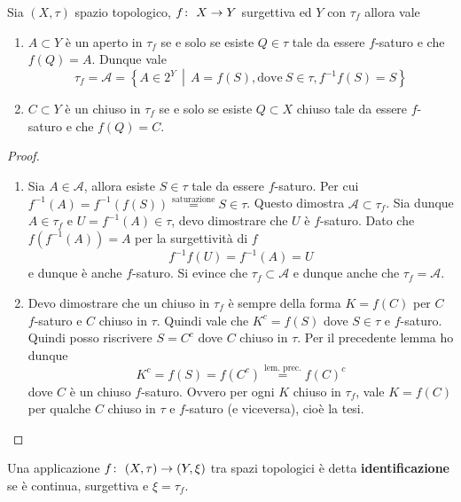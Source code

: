 \begin{theorem}
	Sia $(X, \tau)$ spazio topologico, $f \colon\ X \rightarrow Y$ surgettiva ed $Y$ con $\tau_f$ allora vale 
	\begin{enumerate}
		\item $A \subset Y$ è un aperto in $\tau_f$ se e solo se esiste $Q \in \tau$ tale da essere $f$-saturo e che $f(Q) = A$. Dunque vale 
		\begin{equation*}
			\tau_f = \mathcal{A} = \left\{ A \in 2^Y \,\middle|\, A = f(S), \text{dove}\ S \in \tau, f^{-1}f(S) = S\right\}
		\end{equation*}
		\item $C \subset Y$ è un chiuso in $\tau_f$ se e solo se esiste $Q \subset X$ chiuso tale da essere $f$-saturo e che $f(Q) = C$.
	\end{enumerate}
\end{theorem}
\begin{proof} \
	\begin{enumerate}
			\item Sia $A \in \mathcal{A}$, allora esiste $S \in \tau$ tale da essere $f$-saturo. Per cui $f^{-1}(A) = f^{-1}(f(S)) \overset{\text{saturazione}}{=} S \in \tau$. Questo dimostra $\mathcal{A} \subset \tau_f$. Sia dunque $A \in \tau_f$ e $U = f^{-1}(A) \in \tau$, devo dimostrare che $U$ è $f$-saturo. 
			Dato che $f(f^{-1}(A)) = A$ per la surgettività di $f$   
			\begin{equation*}
				f^{-1}f(U) = f^{-1}(A) = U
			\end{equation*} 
			e dunque è anche $f$-saturo. Si evince che $\tau_f \subset \mathcal{A}$ e dunque anche che $\tau_f = \mathcal{A}$.
		\item Devo dimostrare che un chiuso in $\tau_f$ è sempre della forma $K = f(C)$ per $C$ $f$-saturo e $C$ chiuso in $\tau$. Quindi vale che $K^c = f(S)$ dove $S \in \tau$ e $f$-saturo. Quindi posso riscrivere $S = C^c$ dove $C$ chiuso in $\tau$. Per il precedente lemma ho dunque
		\begin{equation*}
			K^c = f(S) = f(C^c) \overset{\text{lem. prec.}}{=} f(C)^c
		\end{equation*}
		dove $C$ è un chiuso $f$-saturo. Ovvero per ogni $K$ chiuso in $\tau_f$, vale $K = f(C)$ per qualche $C$ chiuso in $\tau$ e $f$-saturo (e viceversa), cioè la tesi.
	\end{enumerate}
\end{proof}

\begin{definition}
	Una applicazione $f \colon\ (X,\tau) \rightarrow (Y, \xi)$ tra spazi topologici è detta \textbf{identificazione} se è continua, surgettiva e $\xi = \tau_f$.
\end{definition}

